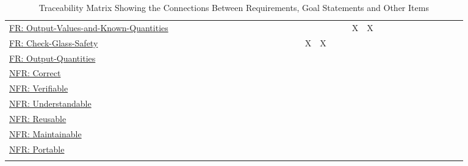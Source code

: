 \documentclass[12pt]{article}
\begin{document}
\begin{longtable}{l l l l l l l l l l l l l l l l l l l l l l l l l l l l l l l l}
\\
\hyperref[outputValsAndKnownQuants]{FR: Output-Values-and-Known-Quantities} &  &  &  &  &  &  &  &  &  &  &  &  &  &  &  &  &  &  &  & X & X &  &  &  &  &  &  &  &  &  & 
\\
\hyperref[checkGlassSafety]{FR: Check-Glass-Safety} &  &  &  &  &  &  &  &  &  &  &  &  &  &  &  & X & X &  &  &  &  &  &  &  &  &  &  &  &  &  & 
\\
\hyperref[outputQuants]{FR: Output-Quantities} &  &  &  &  &  &  &  &  &  &  &  &  &  &  &  &  &  &  &  &  &  &  &  &  &  &  &  &  &  &  & 
\\
\hyperref[correct]{NFR: Correct} &  &  &  &  &  &  &  &  &  &  &  &  &  &  &  &  &  &  &  &  &  &  &  &  &  &  &  &  &  &  & 
\\
\hyperref[verifiable]{NFR: Verifiable} &  &  &  &  &  &  &  &  &  &  &  &  &  &  &  &  &  &  &  &  &  &  &  &  &  &  &  &  &  &  & 
\\
\hyperref[understandable]{NFR: Understandable} &  &  &  &  &  &  &  &  &  &  &  &  &  &  &  &  &  &  &  &  &  &  &  &  &  &  &  &  &  &  & 
\\
\hyperref[reusable]{NFR: Reusable} &  &  &  &  &  &  &  &  &  &  &  &  &  &  &  &  &  &  &  &  &  &  &  &  &  &  &  &  &  &  & 
\\
\hyperref[maintainable]{NFR: Maintainable} &  &  &  &  &  &  &  &  &  &  &  &  &  &  &  &  &  &  &  &  &  &  &  &  &  &  &  &  &  &  & 
\\
\hyperref[portable]{NFR: Portable} &  &  &  &  &  &  &  &  &  &  &  &  &  &  &  &  &  &  &  &  &  &  &  &  &  &  &  &  &  &  & 
\\
\bottomrule
\caption{Traceability Matrix Showing the Connections Between Requirements, Goal Statements and Other Items}
\label{Table:TraceMatAllvsR}
\end{longtable}
\end{document}
